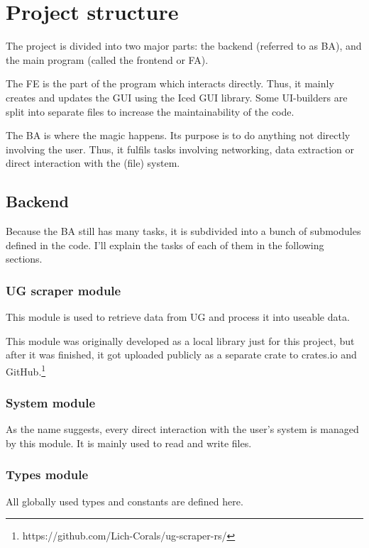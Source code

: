 \documentclass[12pt, a4paper]{article}
\begin{document}
        \section{Project structure}
                The project is divided into two major parts: the backend (referred to as BA), and the main program (called the frontend or FA).

                The FE is the part of the program which interacts directly. Thus, it mainly creates and updates the GUI using the Iced GUI library.\@
                Some UI-builders are split into separate files to increase the maintainability of the code.

                The BA is where the magic happens. Its purpose is to do anything not directly involving the user. Thus, it fulfils tasks involving networking, data extraction or direct interaction with the (file) system.

                \subsection{Backend}
                        Because the BA still has many tasks, it is subdivided into a bunch of submodules defined in the code. I'll explain the tasks of each of them in the following sections.

                        \subsubsection{UG scraper module}
                                This module is used to retrieve data from UG and process it into useable data. 

                                This module was originally developed as a local library just for this project, but after it was finished, it got uploaded publicly as a separate crate to crates.io and GitHub.\footnote{https://github.com/Lich-Corals/ug-scraper-rs/}

                        \subsubsection{System module}
                                As the name suggests, every direct interaction with the user's system is managed by this module. It is mainly used to read and write files.

                        \subsubsection{Types module}
                                All globally used types and constants are defined here.
\end{document}
